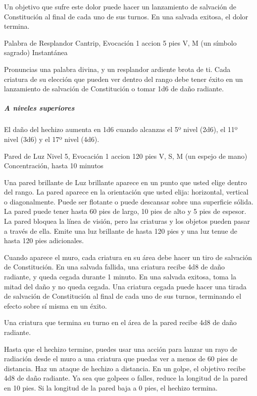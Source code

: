 \documentclass[a4paper,twocolumn,openany,10pt]{dndbook}
\begin{document}
	Un objetivo que sufre este dolor puede hacer un lanzamiento de salvación de Constitución al final de cada uno de sus turnos.
	En una salvada exitosa, el dolor termina. 

\spellheader%
	{Palabra de Resplandor}
	{Cantrip, Evocación}
	{1 accion}
	{5 pies}
	{V, M (un símbolo sagrado)}
	{Instantánea}
	
	Pronuncias una palabra divina, y un resplandor ardiente brota de ti. Cada criatura de su elección que pueden ver dentro del
	rango debe tener éxito en un lanzamiento de salvación de Constitución o tomar 1d6 de daño radiante.

	\subparagraph{A niveles superiores} El daño del hechizo aumenta en 1d6 cuando alcanzas el 5º nivel (2d6), el 11º nivel (3d6)
	y el 17º nivel (4d6). 

\spellheader%
	{Pared de Luz}
	{Nivel 5, Evocación}
	{1 accion}
	{120 pies}
	{V, S, M (un espejo de mano)}
	{Concentración, hasta 10 minutos}
	
	Una pared brillante de Luz brillante aparece en un punto que usted elige dentro del rango. La pared aparece en la
	orientación que usted elija: horizontal, vertical o diagonalmente. Puede ser flotante o puede descansar sobre una superficie
	sólida. La pared puede tener hasta 60 pies de largo, 10 pies de alto y 5 pies de espesor. La pared bloquea la línea de
	visión, pero las criaturas y los objetos pueden pasar a través de ella. Emite una luz brillante de hasta 120 pies y una luz
	tenue de hasta 120 pies adicionales.
	
	Cuando aparece el muro, cada criatura en su área debe hacer un tiro de salvación de Constitución. En una salvada fallida,
	una criatura recibe 4d8 de daño radiante, y queda cegada durante 1 minuto. En una salvada exitosa, toma la mitad del daño y
	no queda cegada. Una criatura cegada puede hacer una tirada de salvación de Constitución al final de cada uno de sus turnos,
	terminando el efecto sobre sí misma en un éxito.
	
	Una criatura que termina su turno en el área de la pared recibe 4d8 de daño radiante.
	
	Hasta que el hechizo termine, puedes usar una acción para lanzar un rayo de radiación desde el muro a una criatura que
	puedas ver a menos de 60 pies de distancia. Haz un ataque de hechizo a distancia. En un golpe, el objetivo recibe 4d8 de
	daño radiante. Ya sea que golpees o falles, reduce la longitud de la pared en 10 pies. Si la longitud de la pared baja a 0
	pies, el hechizo termina.
\end{document}
